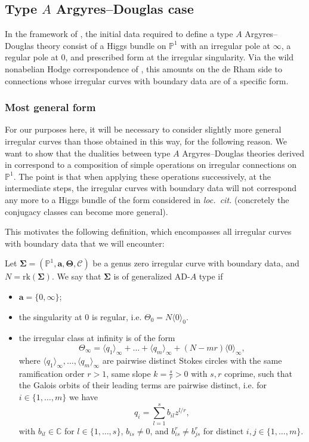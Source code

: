 \documentclass[11pt,a4paper]{amsart}
\numberwithin{equation}{section}
\newcommand{\cir}[1]{\langle #1 \rangle}
\begin{document}
\subsection{Type $A$ Argyres--Douglas case}

In the framework of \cite{beem2025simplifying}, the initial data required to define a type $A$ Argyres--Douglas theory consist of a Higgs bundle on $\mathbb P^1$ with an irregular pole at $\infty$, a regular pole at $0$, and prescribed form at the irregular singularity. Via the wild nonabelian Hodge correspondence of \cite{biquard2004wild}, this amounts on the de Rham side to connections whose irregular curves with boundary data are of a specific form. 


\subsubsection{Most general form}

For our purposes here, it will be necessary to consider slightly more general irregular curves than those obtained in this way, for the following reason. We want to show that the dualities between type $A$ Argyres--Douglas theories derived in \cite{beem2025simplifying} correspond to a composition of simple operations on irregular connections on $\mathbb P^1$. The point is that when applying these operations successively, at the intermediate steps, the irregular curves with boundary data will not correspond any more to a Higgs bundle of the form considered in \emph{loc.~cit.} (concretely the conjugacy classes can become more general).


This motivates the following definition, which encompasses all irregular curves with boundary data that we will encounter:

\begin{definition}
\label{def:generalized_ADA_type}
Let $\bm{\Sigma}=(\mathbb P^1, \mathbf a, \bm \Theta, \bm{\mathcal C})$ be a genus zero irregular curve with boundary data, and $N=\mathrm{rk}(\bm\Sigma)$. We say that $\bm{\Sigma}$ is of generalized AD-$A$ type if
\begin{itemize}
 \item $\mathbf a=\{0, \infty\}$;
 \item the singularity at 0 is regular, i.e. $\Theta_0= N \cir{0}_0$.
 \item the irregular class at infinity is of the form
 \begin{equation}
  \Theta_\infty=\cir{q_1}_\infty+\dots+\cir{q_m}_\infty+ (N-mr)\cir{0}_\infty,
 \end{equation}
 where $\cir{q_1}_\infty, \dots, \cir{q_m}_\infty$ are pairwise distinct Stokes circles with the same ramification order $r>1$, same slope $k=\frac{s}{r}>0$ with $s,r$ coprime, such that the Galois orbits of their leading terms are pairwise distinct, i.e.  for $i\in\{1, \dots, m\}$ we have
\begin{equation}
q_i=\sum_{l=1}^{s} b_{il} z^{l/r},
\end{equation}
with $b_{il}\in \mathbb C$ for $l\in \{1, \dots, s\}$, $b_{is}\neq 0$, and $b_{is}^r\neq b_{js}^r$ for distinct $i,j\in \{1, \dots, m\}$.
\end{itemize}
\end{definition}
\end{document}
